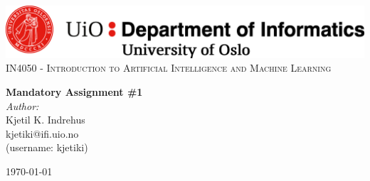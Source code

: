 \begin{titlepage}
    \vbox{ }
    \vbox{ }
    \begin{center}
        \includegraphics[width=1\textwidth]{./images/ifi.png}\\[1cm]
        \textsc{\Large IN4050 - Introduction to Artificial Intelligence and Machine Learning}\\[0.5cm]
        \vbox{ }
        
        { \huge \bfseries Mandatory Assignment \#1}\\[0.4cm]
        
        \large
        \emph{Author:}\\
            Kjetil K. Indrehus \\[0.9cm]
           
            \large kjetiki@ifi.uio.no \\[0.1cm]
            (username: kjetiki)
        \vfill
        
        {\large\today}
    \end{center}
\end{titlepage}
